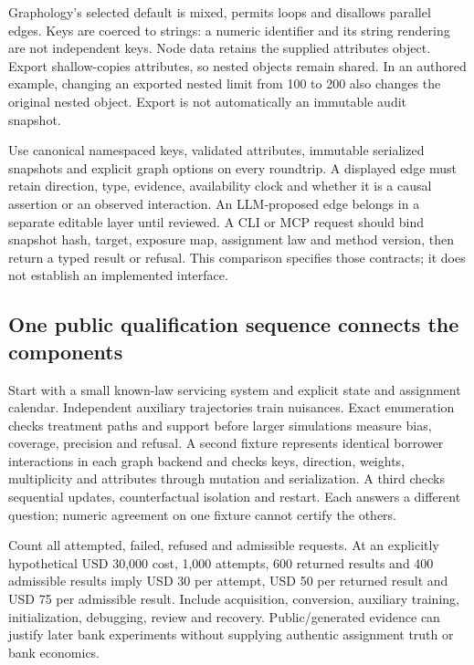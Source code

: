 Graphology's selected default is mixed, permits loops and disallows parallel
edges. Keys are coerced to strings: a numeric identifier and its string
rendering are not independent keys. Node data retains the supplied attributes
object. Export shallow-copies attributes, so nested objects remain shared.
In an authored example, changing an exported nested limit from 100 to 200 also
changes the original nested object. Export is not automatically an immutable
audit snapshot.~\citep{exec25_onet_graphology,exec25_onet_choice}

Use canonical namespaced keys, validated attributes, immutable serialized
snapshots and explicit graph options on every roundtrip. A displayed edge
must retain direction, type, evidence, availability clock and whether it is
a causal assertion or an observed interaction. An LLM-proposed edge belongs
in a separate editable layer until reviewed. A CLI or MCP request should bind
snapshot hash, target, exposure map, assignment law and method version, then
return a typed result or refusal. This comparison specifies those contracts;
it does not establish an implemented interface.
\citep{exec25_onet_graphology,exec25_onet_choice}

\subsection{One public qualification sequence connects the components}

Start with a small known-law servicing system and explicit state and assignment
calendar. Independent auxiliary trajectories train nuisances. Exact enumeration
checks treatment paths and support before larger simulations measure bias,
coverage, precision and refusal. A second fixture represents identical borrower
interactions in each graph backend and checks keys, direction, weights,
multiplicity and attributes through mutation and serialization. A third checks
sequential updates, counterfactual isolation and restart. Each answers a
different question; numeric agreement on one fixture cannot certify the others.
\citep{exec25_onet_choice}

Count all attempted, failed, refused and admissible requests. At an explicitly
hypothetical USD 30,000 cost, 1,000 attempts, 600 returned results and 400
admissible results imply USD 30 per attempt, USD 50 per returned result and
USD 75 per admissible result. Include acquisition,
conversion, auxiliary training, initialization, debugging, review and recovery.
Public/generated evidence can justify later bank experiments without supplying
authentic assignment truth or bank economics.~\citep{exec25_onet_choice}

